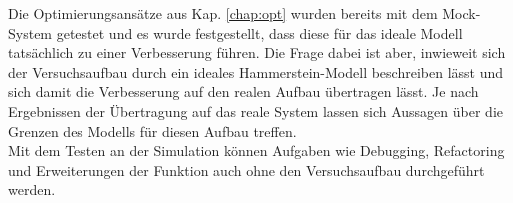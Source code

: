 \documentclass[../Report.tex]{subfiles}
\begin{document}
Die Optimierungsansätze aus Kap. \ref{chap:opt} wurden bereits mit dem Mock-System getestet und es wurde festgestellt, dass diese für das ideale Modell tatsächlich zu einer Verbesserung führen. Die Frage dabei ist aber, inwieweit sich der Versuchsaufbau durch ein ideales Hammerstein-Modell beschreiben lässt und sich damit die Verbesserung auf den realen Aufbau übertragen lässt. Je nach Ergebnissen der Übertragung auf das reale System lassen sich Aussagen über die Grenzen des Modells für diesen Aufbau treffen.\\
Mit dem Testen an der Simulation können Aufgaben wie Debugging, Refactoring und Erweiterungen der Funktion auch ohne den Versuchsaufbau durchgeführt werden.
\end{document}
